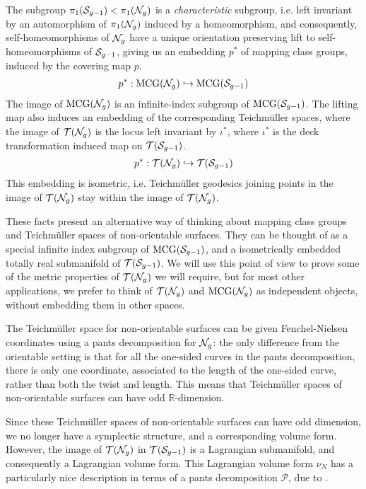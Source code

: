 The subgroup $\pi_1(\mathcal{S}_{g-1}) < \pi_1(\mathcal{N}_g)$ is a \emph{characteristic} subgroup, i.e. left invariant by an automorphism of $\pi_{1}(\mathcal{N}_g)$ induced by a homeomorphism, and consequently, self-homeomorphisms of $\mathcal{N}_g$ have a unique orientation preserving lift to self-homeomorphisms of $\mathcal{S}_{g-1}$, giving us an embedding $p^\ast$ of mapping class groups, induced by the covering map $p$.
\begin{align*}
  p^{\ast}: \mathrm{MCG}(\mathcal{N}_g) \hookrightarrow \mathrm{MCG}(\mathcal{S}_{g-1})
\end{align*}
The image of $\mathrm{MCG}(\mathcal{N}_g)$ is an infinite-index subgroup of $\mathrm{MCG}(\mathcal{S}_{g-1})$.
The lifting map also induces an embedding of the corresponding Teichmüller spaces, where the image of $\mathcal{T}(\mathcal{N}_g)$ is the locus left invariant by $\iota^{\ast}$, where $\iota^{\ast}$ is the deck transformation induced map on $\mathcal{T}(\mathcal{S}_{g-1})$.
\begin{align*}
  p^{\ast}: \mathcal{T}(\mathcal{N}_g) \hookrightarrow \mathcal{T}(\mathcal{S}_{g-1})
\end{align*}
This embedding is isometric, i.e. Teichmüller geodesics joining points in the image of $\mathcal{T}(\mathcal{N}_g)$ stay within the image of $\mathcal{T}(\mathcal{N}_g)$.

These facts present an alternative way of thinking about mapping class groups and Teichmüller spaces of non-orientable surfaces.
They can be thought of as a special infinite index subgroup of $\mathrm{MCG}(\mathcal{S}_{g-1})$, and a isometrically embedded totally real submanifold of $\mathcal{T}(\mathcal{S}_{g-1})$.
We will use this point of view to prove some of the metric properties of $\mathcal{T}(\mathcal{N}_g)$ we will require, but for most other applications, we prefer to think of $\mathcal{T}(\mathcal{N}_g)$ and $\mathrm{MCG}(\mathcal{N}_g)$ as independent objects, without embedding them in other spaces.

The Teichmüller space for non-orientable surfaces can be given Fenchel-Nielsen coordinates using a pants decomposition for $\mathcal{N}_g$: the only difference from the orientable setting is that for all the one-sided curves in the pants decomposition, there is only one coordinate, associated to the length of the one-sided curve, rather than both the twist and length.
This means that Teichmüller spaces of non-orientable surfaces can have odd $\mathbb{R}$-dimension.

Since these Teichmüller spaces of non-orientable surfaces can have odd dimension, we no longer have a symplectic structure, and a corresponding volume form.
However, the image of $\mathcal{T}(\mathcal{N}_g)$ in $\mathcal{T}(\mathcal{S}_{g-1})$ is a Lagrangian submanifold, and consequently a Lagrangian volume form.
This Lagrangian volume form $\nu_N$ has a particularly nice description in terms of a pants decomposition $\mathcal{P}$, due to \textcite{norbury2008lengths}.

